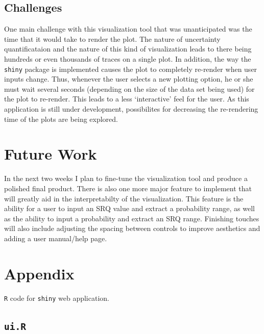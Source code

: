 \documentclass[11pt]{asaproc}\usepackage[]{graphicx}\usepackage[]{color}
\begin{document}
\subsection{Challenges}
One main challenge with this visualization tool that was unanticipated was the time that it would take to render the plot. The nature of uncertainty quantificataion and the nature of this kind of visualization leads to there being hundreds or even thousands of traces on a single plot. In addition, the way the {\tt shiny} package is implemented causes the plot to completely re-render when user inputs change. Thus, whenever the user selects a new plotting option, he or she must wait several seconds (depending on the size of the data set being used) for the plot to re-render. This leads to a less `interactive' feel for the user. As this application is still under development, possibilites for decreasing the re-rendering time of the plots are being explored. 

\section{Future Work}
\label{Future}

In the next two weeks I plan to fine-tune the visualization tool and produce a polished final product. There is also one more major feature to implement that will greatly aid in the interpretabilty of the visualization. This feature is the ability for a user to input an SRQ value and extract a probability range, as well as the ability to input a probability and extract an SRQ range. Finishing touches will also include adjusting the spacing between controls to improve aesthetics and adding a user manual/help page. 

\newpage




\newpage
\appendix
\section{Appendix}
\label{Appendix}

{\tt R} code for {\tt shiny} web application.

\subsection{{\tt ui.R}}
\end{document}
